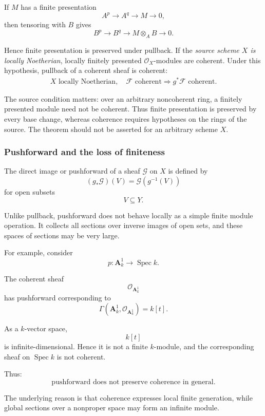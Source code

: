 If \(M\) has a finite presentation
\[
A^p\longrightarrow A^q\longrightarrow M\longrightarrow 0,
\]
then tensoring with \(B\) gives
\[
B^p\longrightarrow B^q\longrightarrow M\otimes_A B\longrightarrow 0.
\]

Hence finite presentation is preserved under pullback.
If the \emph{source scheme \(X\) is locally Noetherian}, locally
finitely presented \(\mathcal O_X\)-modules are coherent. Under
this hypothesis, pullback of a coherent sheaf is coherent:
\[
\boxed{
	\begin{gathered}
	X\text{ locally Noetherian},\quad\mathcal F\text{ coherent}
	\Longrightarrow g^*\mathcal F\text{ coherent}.
	\end{gathered}
}
\]

\begin{remark}
	The source condition matters: over an arbitrary noncoherent ring,
	a finitely presented module need not be coherent. Thus finite
	presentation is preserved by every base change, whereas coherence
	requires hypotheses on the rings of the source. The theorem should
	not be asserted for an arbitrary scheme \(X\).
\end{remark}

\subsubsection{Pushforward and the loss of finiteness}

The direct image or pushforward of a sheaf \(\mathcal{G}\) on \(X\) is defined by
\[
(g_*\mathcal{G})(V)
=
\mathcal{G}(g^{-1}(V))
\]
for open subsets
\[
V\subseteq Y.
\]

Unlike pullback, pushforward does not behave locally as a simple finite module operation. It collects all sections over inverse images of open sets, and these spaces of sections may be very large.

For example, consider
\[
p:\mathbf{A}^1_k\longrightarrow\operatorname{Spec} k.
\]

The coherent sheaf
\[
\mathcal{O}_{\mathbf{A}^1_k}
\]
has pushforward corresponding to
\[
\Gamma(\mathbf{A}^1_k,\mathcal{O}_{\mathbf{A}^1_k})
=
k[t].
\]

As a \(k\)-vector space,
\[
k[t]
\]
is infinite-dimensional. Hence it is not a finite \(k\)-module, and the corresponding sheaf on \(\operatorname{Spec} k\) is not coherent.

Thus:
\[
\boxed{
	\text{pushforward does not preserve coherence in general.}
}
\]

The underlying reason is that coherence expresses local finite generation, while global sections over a nonproper space may form an infinite module.

